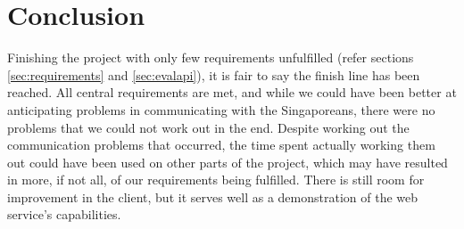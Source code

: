 \section{Conclusion}
Finishing the project with only few requirements unfulfilled (refer sections
\ref{sec:requirements} and \ref{sec:evalapi}), it is fair to say the finish
line has been reached. All central requirements are met, and while we could
have been better at anticipating problems in communicating with the
Singaporeans, there were no problems that we could not work out in the end.
Despite working out the communication problems that occurred, the time spent 
actually working them out could have been used on other parts of the project, 
which may have resulted in more, if not all, of our requirements being fulfilled.
There is still room for improvement in the client, but it serves well as a
demonstration of the web service's capabilities.
